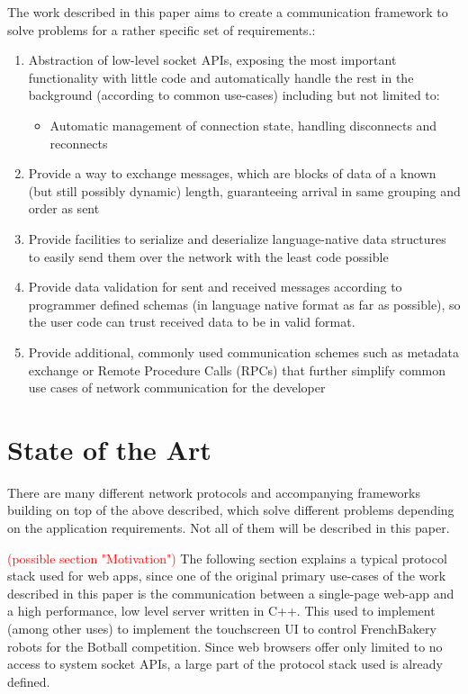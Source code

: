 \documentclass[conference]{IEEEtran}
\begin{document}
The work described in this paper aims to create a communication framework to solve problems for a rather specific set of requirements.:

\begin{enumerate}
    \item Abstraction of low-level socket APIs, exposing the most important functionality with little code and automatically handle the rest in the background (according to common use-cases) including but not limited to:
    \begin{itemize}
        \item Automatic management of connection state, handling disconnects and reconnects
    \end{itemize}
    \item Provide a way to exchange messages, which are blocks of data of a known (but still possibly dynamic) length, guaranteeing arrival in same grouping and order as sent
    \item Provide facilities to serialize and deserialize language-native data structures to easily send them over the network with the least code possible
    \item Provide data validation for sent and received messages according to programmer defined schemas (in language native format as far as possible), so the user code can trust received data to be in valid format.
    \item Provide additional, commonly used communication schemes such as metadata exchange or Remote Procedure Calls (RPCs) that further simplify common use cases of network communication for the developer
\end{enumerate}


\section{State of the Art}

There are many different network protocols and accompanying frameworks building on top of the above described, which solve different problems depending on the application requirements. Not all of them will be described in this paper.


\textcolor{red}{(possible section "Motivation")}
The following section explains a typical protocol stack used for web apps, since one of the original primary use-cases of the work described in this paper is the communication between a single-page web-app and a high performance, low level server written in C++. This used to implement (among other uses) to implement the touchscreen UI to control FrenchBakery robots for the Botball competition. Since web browsers offer only limited to no access to system socket APIs, a large part of the protocol stack used is already defined.
\end{document}
